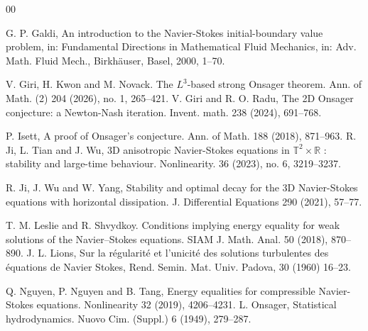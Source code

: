 \documentclass[11pt]{article}
\theoremstyle{plain}\newtheorem{definition}{Definition}[section]
\theoremstyle{definition}\newtheorem{theorem}{Theorem}[section]
\theoremstyle{plain}\newtheorem{lemma}[theorem]{Lemma}
\theoremstyle{plain}\newtheorem{coro}[theorem]{Corollary}
\theoremstyle{plain}\newtheorem{prop}[theorem]{Proposition}
\theoremstyle{remark}\newtheorem{remark}{Remark}[section]
\numberwithin{equation}{section}
\begin{document}
\begin{thebibliography}{00}





\bibitem{[Galdi]} G. P. Galdi, An introduction to the Navier-Stokes initial-boundary value problem, in: Fundamental Directions in Mathematical Fluid Mechanics, in: Adv. Math. Fluid Mech., Birkh\"auser, Basel, 2000,   1--70.

\bibitem{[GKN]}   V. Giri, H. Kwon  and M. Novack.
The $L^{3}$-based strong Onsager theorem. Ann. of Math. (2) 204 (2026), no. 1, 265--421.
\bibitem{[GR]}  V. Giri and R. O. Radu, The 2D Onsager conjecture: a Newton-Nash iteration. Invent. math. 238 (2024), 691--768.





\bibitem{[Isett]}
P. Isett,
A proof of Onsager's conjecture.
Ann. of Math.  188 (2018),  871--963.
\bibitem{[JTW]}
R. Ji, L. Tian and J. Wu, 3D anisotropic Navier-Stokes equations in $\mathbb{T}^2\times \mathbb{R}$ : stability and large-time behaviour. Nonlinearity. 36 (2023), no. 6, 3219--3237.

\bibitem{[JWY]}
R. Ji, J. Wu and W. Yang, Stability and optimal decay for the 3D Navier-Stokes equations with horizontal dissipation. J. Differential Equations 290 (2021), 57--77.












 \bibitem{[LS]}
T. M. Leslie and R. Shvydkoy. Conditions implying energy equality for weak solutions of the Navier--Stokes equations. SIAM J. Math. Anal.
 50 (2018), 870--890.
\bibitem{[Lions]}
J. L. Lions, Sur la r\'egularit\'e et l'unicit\'e des solutions turbulentes des \'equations de Navier Stokes, Rend. Semin. Mat. Univ. Padova, 30 (1960) 16--23.

\bibitem{[NNT]}
Q. Nguyen,  P. Nguyen and B. Tang,   Energy equalities for compressible Navier-Stokes equations. Nonlinearity 32 (2019),   4206--4231.
      \bibitem{[Onsager]}
L. Onsager,  Statistical hydrodynamics. Nuovo Cim. (Suppl.) 6 (1949), 279--287.


\end{thebibliography}
\end{document}
